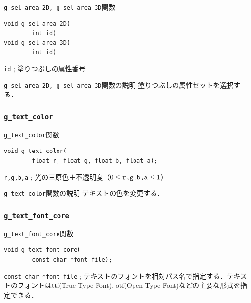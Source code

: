 \documentclass[platex,a4paper,12pt]{jsarticle}%
\begin{document}
\begin{itembox}[l]{\texttt{g\_sel\_area\_2D, g\_sel\_area\_3D}関数}
\begin{verbatim}
void g_sel_area_2D(
        int id);
void g_sel_area_3D(
        int id);
\end{verbatim}
\verb|id| ; 塗りつぶしの属性番号
\end{itembox}

\begin{itembox}[l]{\texttt{g\_sel\_area\_2D, g\_sel\_area\_3D}関数の説明}
塗りつぶしの属性セットを選択する．
\end{itembox}


\clearpage
\subsubsection{\texttt{g\_text\_color}}

\begin{itembox}[l]{\texttt{g\_text\_color}関数}
\begin{verbatim}
void g_text_color(
        float r, float g, float b, float a);
\end{verbatim}
\verb|r,g,b,a| ; 光の三原色＋不透明度（$0\leq \verb|r,g,b,a| \leq 1$）\\
\end{itembox}

\begin{itembox}[l]{\texttt{g\_text\_color}関数の説明}
テキストの色を変更する．
\end{itembox}

\subsubsection{\texttt{g\_text\_font\_core}}

\begin{itembox}[l]{\texttt{g\_text\_font\_core}関数}
\begin{verbatim}
void g_text_font_core(
        const char *font_file);
\end{verbatim}
\verb|const char *font_file| ; テキストのフォントを相対パス名で指定する．テキストのフォントはttf(True Type Font), otf(Open Type Font)などの主要な形式を指定できる．\\
\end{itembox}
\end{document}
